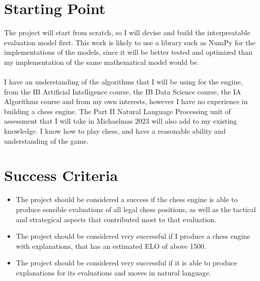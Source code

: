 \documentclass[12pt,a4paper]{article}
\begin{document}
\section*{Starting Point}
The project will start from scratch, so I will devise and build the interpreatable evaluation model first. This work is likely to use a library such as NumPy for the implementations of the models, since it will be better tested and optimized than my implementation of the same mathematical model would be.
\\\\
I have an understanding of the algorithms that I will be using for the engine, from the IB Artificial Intelligence course, the IB Data Science course, the IA Algorithms course and from my own interests, however I have no experience in building a chess engine. The Part II Natural Language Processing unit of assessment that I will take in Michaelmas 2023 will also add to my existing knowledge. I know how to play chess, and have a reasonable ability and understanding of the game.

\section*{Success Criteria}
\begin{itemize}
    \item The project should be considered a success if the chess engine is able to produce sensible evaluations of all legal chess positions, as well as the tactical and strategical aspects that contributed most to that evaluation. 
    \item The project should be considered very successful if I produce a chess engine with explanations, that has an estimated ELO of above 1500.
    \item The project should be considered very successful if it is able to produce explanations for its evaluations and moves in natural language.
\end{itemize}
\end{document}
